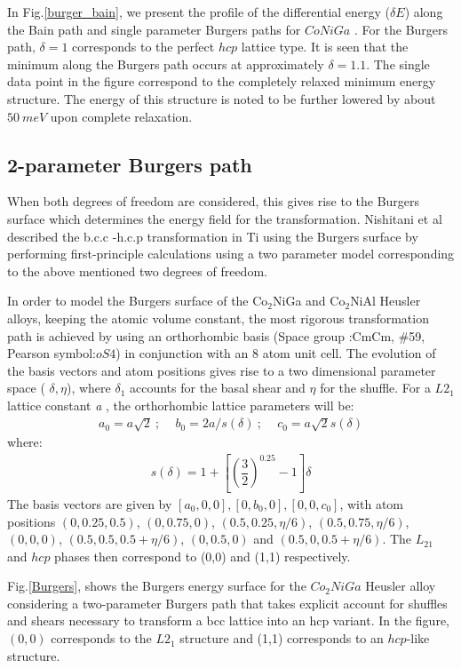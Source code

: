 \documentclass[%
preprint,
 amsmath,amssymb,
 aps,
prb,
showkeys,
]{revtex4-1}
\begin{document}
In Fig.\ref{burger_bain}, we present the profile of the differential energy ($\delta E$) along the Bain path and single parameter Burgers paths for $CoNiGa$ . For the Burgers path, $\delta =1$ corresponds to the perfect $hcp$ lattice type. It is seen that the minimum along the Burgers path occurs at approximately $\delta =1.1$. The single data point in the figure correspond to the completely relaxed minimum energy structure. The energy of this structure is noted to be further lowered by about $50 \ meV $ upon complete relaxation. 

\subsection{2-parameter Burgers path}
\label{Sec:2D_formalism}
 When both degrees of freedom are considered, this gives rise to the Burgers surface which determines the energy field for the transformation. Nishitani et al \cite{nishitani2001first} described the b.c.c -h.c.p transformation in Ti using the Burgers surface by performing first-principle calculations using a two parameter model corresponding to the above mentioned two degrees of freedom. 

 In order to model the Burgers surface of the Co$_2$NiGa and Co$_2$NiAl Heusler alloys, keeping the atomic volume constant, the most rigorous transformation path is achieved by using an orthorhombic basis (Space group :CmCm, \#59, Pearson symbol:$oS4$) in conjunction with an 8 atom unit cell. The evolution of the basis vectors and atom positions gives rise to a two dimensional parameter space ( $\delta, \eta$), where $\delta_1$ accounts for the basal shear and $\eta$ for the shuffle. For a $L2_{1}$ lattice constant \textit{a} , the orthorhombic lattice parameters will be:
\begin{align}
  a_0 =a\sqrt{2}\ ; \ \ \ \ \; b_0 =2a/s(\delta)\ ; \ \ \ \ \; c_0 = a\sqrt{2}s(\delta)
  \end{align}
where:  
\begin{align}
s(\delta) = 1 + \left[\left( \dfrac{3}{2}\right)^{0.25} - 1\right]\delta
\end{align}
The basis vectors are given by $[a_0,0,0],[0,b_0,0],[0,0,c_0]$, with atom positions $(0, 0.25, 0.5)$, $(0, 0.75, 0)$, $(0.5, 0.25, \eta/6)$, $(0.5, 0.75, \eta/6)$, $(0, 0, 0)$, $(0.5, 0.5, 0.5 + \eta/6)$, $(0, 0.5, 0)$ and  $(0.5, 0, 0.5 + \eta/6)$.
The $L_21$ and $hcp$ phases then correspond to (0,0) and (1,1) respectively.

Fig.\ref{Burgers}, shows the Burgers energy surface for the $Co_2NiGa$  Heusler alloy considering a two-parameter Burgers path that takes explicit account for shuffles and shears necessary to transform a bcc lattice into an hcp variant. In the figure, $(0,0)$ corresponds to the $L2_1$ structure and (1,1) corresponds to an $hcp$-like structure. 
\end{document}

